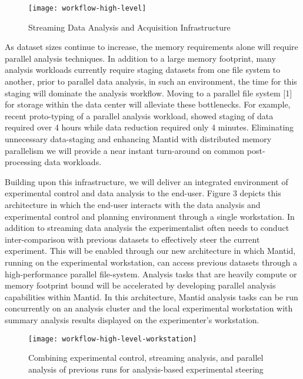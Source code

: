 \begin{figure}[h!]
  \caption{Streaming Data Analysis and Acquisition Infrastructure}
  \centering
  \texttt{[image: workflow-high-level]}
\end{figure}


As dataset sizes continue to increase, the memory requirements alone
will require parallel analysis techniques. In addition to a large
memory footprint, many analysis workloads currently require staging
datasets from one file system to another, prior to parallel data
analysis, in such an environment, the time for this staging will
dominate the analysis workflow. Moving to a parallel file system [1]
for storage within the data center will alleviate these
bottlenecks. For example, recent proto-typing of a parallel analysis
workload, showed staging of data required over 4 hours while data
reduction required only 4 minutes. Eliminating unnecessary
data-staging and enhancing Mantid with distributed memory parallelism
we will provide a near instant turn-around on common post-processing
data workloads.


Building upon this infrastructure, we will deliver an integrated
environment of experimental control and data analysis to the
end-user. Figure 3 depicts this architecture in which the end-user
interacts with the data analysis and experimental control and planning
environment through a single workstation. In addition to streaming
data analysis the experimentalist often needs to conduct
inter-comparison with previous datasets to effectively steer the
current experiment. This will be enabled through our new architecture
in which Mantid, running on the experimental workstation, can access
previous datasets through a high-performance parallel
file-system. Analysis tasks that are heavily compute or memory
footprint bound will be accelerated by developing parallel analysis
capabilities within Mantid. In this architecture, Mantid analysis
tasks can be run concurrently on an analysis cluster and the local
experimental workstation with summary analysis results displayed on
the experimenter’s workstation. 


\begin{figure}[h!]
  \caption{Combining experimental control, streaming analysis, and parallel analysis of previous runs for analysis-based experimental steering}
  \centering
  \texttt{[image: workflow-high-level-workstation]}
\end{figure}

